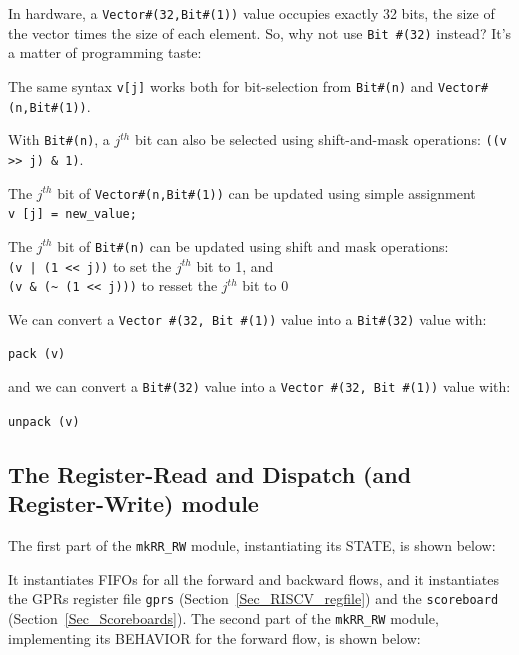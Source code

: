 In hardware, a \verb|Vector#(32,Bit#(1))| value occupies exactly 32
bits, {\ie} the size of the vector times the size of each element.
So, why not use \verb|Bit #(32)| instead?  It's a matter of
programming taste:

\begin{tightlist}

  \item The same syntax \verb|v[j]| works both for bit-selection from
        \verb|Bit#(n)| and \verb|Vector#(n,Bit#(1))|.

  \item With \verb|Bit#(n)|, a $j^{th}$ bit can also be selected using
        shift-and-mask operations: \verb|((v >> j) & 1)|.

  \item The $j^{th}$ bit of \verb|Vector#(n,Bit#(1))| can be updated
        using simple assignment \\
	\hmm \verb|v [j] = new_value;|

  \item The $j^{th}$ bit of \verb|Bit#(n)| can be updated using shift
        and mask operations: \\
	\hmm \verb'(v | (1 << j))' to set the $j^{th}$ bit to 1, and \\
	\hmm \verb|(v & (~ (1 << j)))| to resset the $j^{th}$ bit to 0

\end{tightlist}

We can convert a \verb|Vector #(32, Bit #(1))| value into a \verb|Bit#(32)| value with:

\hmm \verb|pack (v)|

and we can convert a \verb|Bit#(32)| value into a \verb|Vector #(32, Bit #(1))| value with:

\hmm \verb|unpack (v)|


\subsection{The Register-Read and Dispatch (and Register-Write) module}

\label{Sec_mkRR_RW}

The first part of the \verb|mkRR_RW| module, instantiating its STATE, is shown below:


It instantiates FIFOs for all the forward and backward flows, and it
instantiates the GPRs register file \verb|gprs|
(Section~\ref{Sec_RISCV_regfile}) and the \verb|scoreboard|
(Section~\ref{Sec_Scoreboards}).  The second part of the
\verb|mkRR_RW| module, implementing its BEHAVIOR for the forward flow,
is shown below:

